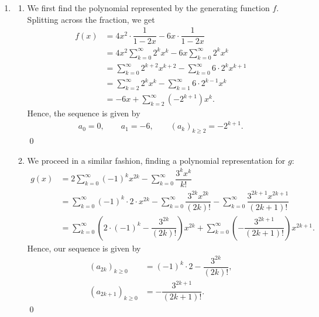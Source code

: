 \documentclass[12pt]{article}
\begin{document}
\begin{enumerate}
  \item
    \begin{enumerate}
      \item We first find the polynomial represented by the
        generating function $f.$ Splitting across the fraction, we get
        \begin{align*}
          f(x) &= 4x^2 \cdot \dfrac{1}{1-2x} - 6x \cdot \dfrac{1}{1-2x} \\
          &= 4x^2 \sum_{k = 0}^{\infty}2^k x^k - 6x \sum_{k =
          0}^{\infty}2^k x^k \\
          &= \sum_{k = 0}^\infty 2^{k +2} x^{k + 2} - \sum_{k =
          0}^\infty 6 \cdot 2^k x^{k + 1} \\
          &= \sum_{k = 2}^{\infty}2^k x^k - \sum_{k = 1}^{\infty} 6
          \cdot 2^{k - 1} x^k \\
          &= -6x + \sum_{k = 2}^{\infty} (- 2^{k + 1} )x^k.
        \end{align*}
        Hence, the sequence is given by
        \begin{align*}
          a_0 = 0, \qquad a_1 = -6,  \qquad (a_k)_{k \geq 2} = -2^{k + 1}.
        \end{align*}
        \qed

      \item We proceed in a similar fashion, finding a polynomial
        representation for $g$:
        \begin{align*}
          g(x) &= 2 \sum_{k = 0}^\infty(-1)^k x^{2k} - \sum_{k =
          0}^{\infty}\dfrac{3^k x^k}{k!} \\
          &= \sum_{k = 0}^{\infty} (-1)^k \cdot 2 \cdot x^{2k} -
          \sum_{k = 0}^{\infty}  \dfrac{3^{2k} x^{2k}}{(2k)!} -
          \sum_{k = 0}^\infty \dfrac{3^{2k + 1}x^{2k + 1}}{(2k + 1)!} \\
          &= \sum_{k = 0}^\infty \left(2 \cdot (-1)^k -
          \dfrac{3^{2k}}{(2k)!}\right)x^{2k} + \sum_{k = 0}^{\infty}
          \left(- \dfrac{3^{2k + 1}}{(2k+1)!}\right) x^{2k + 1}.
        \end{align*}
        Hence, our sequence is given by
        \begin{align*}
          (a_{2k})_{k \geq 0} &= (-1)^k \cdot 2 - \dfrac{3^{2k}}{(2k)!}, \\
          (a_{2k + 1})_{k \geq 0} &= - \dfrac{3^{2k + 1}}{(2k + 1)!}.
        \end{align*}
        \qed
    \end{enumerate}


\end{enumerate}
\end{document}
